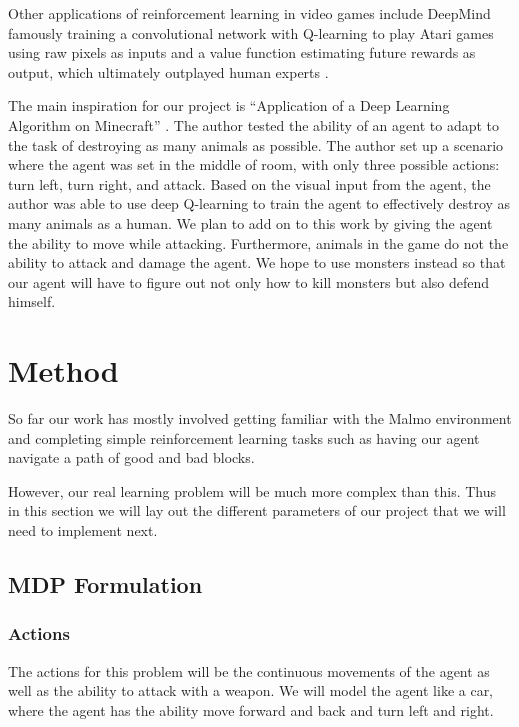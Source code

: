 \documentclass{article}
\begin{document}
Other applications of reinforcement learning in video games include DeepMind famously training a convolutional network with Q-learning to play Atari games using raw pixels as inputs and a value function estimating future rewards as output, which ultimately outplayed human experts \cite{deepMind}.

The main inspiration for our project is “Application of a Deep Learning Algorithm on Minecraft” \cite{vandegoor}. The author tested the ability of an agent to adapt to the task of destroying as many animals as possible. The author set up a scenario where the agent was set in the middle of room, with only three possible actions: turn left, turn right, and attack. Based on the visual input from the agent, the author was able to use deep Q-learning to train the agent to effectively destroy as many animals as a human. We plan to add on to this work by giving the agent the ability to move while attacking. Furthermore, animals in the game do not the ability to attack and damage the agent. We hope to use monsters instead so that our agent will have to figure out not only how to kill monsters but also defend himself. 

\section{Method}

So far our work has  mostly involved getting familiar with the Malmo environment and completing simple  reinforcement learning tasks such as  having our agent  navigate a path of good and bad blocks.

However, our real learning problem will be much more complex than this. Thus in this section we will lay out the different parameters of our project that we will need to implement next. 

\subsection{ MDP Formulation}

\subsubsection{ Actions}

The actions for this problem will be the continuous movements of the agent as well as the ability to attack with a weapon. We will model the agent like a car, where the agent has the ability move forward and back and  turn left and right. 
\end{document}

